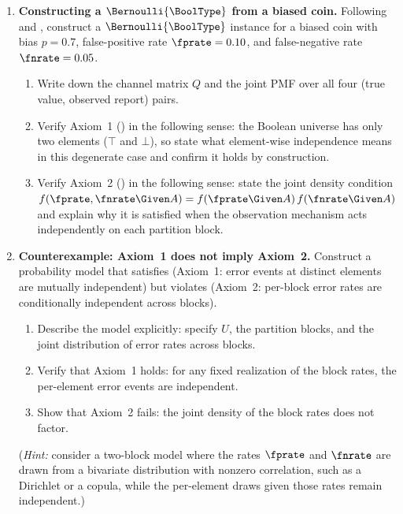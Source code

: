 \begin{enumerate}
\item \exstarstar
\textbf{Constructing a $\Bernoulli{\BoolType}$ from a biased coin.}
Following  and ,
construct a $\Bernoulli{\BoolType}$ instance for a biased coin with
bias $p = 0.7$, false-positive rate $\fprate = 0.10$, and false-negative
rate $\fnrate = 0.05$.
\begin{enumerate}
  \item[(a)] Write down the channel matrix $Q$ and the joint PMF over all
    four (true value, observed report) pairs.
  \item[(b)] Verify Axiom~1 () in the following sense:
    the Boolean universe has only two elements ($\top$ and $\bot$), so state
    what element-wise independence means in this degenerate case and confirm
    it holds by construction.
  \item[(c)] Verify Axiom~2 () in the following
    sense: state the joint density condition $f(\fprate, \fnrate \Given A) =
    f(\fprate \Given A)\,f(\fnrate \Given A)$ and explain why it is satisfied
    when the observation mechanism acts independently on each partition block.
\end{enumerate}


\item \exstarstarstar
\textbf{Counterexample: Axiom~1 does not imply Axiom~2.}
Construct a probability model that satisfies 
(Axiom~1: error events at distinct elements are mutually independent) but
violates  (Axiom~2: per-block error rates are
conditionally independent across blocks).
\begin{enumerate}
  \item[(a)] Describe the model explicitly: specify $U$, the partition blocks,
    and the joint distribution of error rates across blocks.
  \item[(b)] Verify that Axiom~1 holds: for any fixed realization of the
    block rates, the per-element error events are independent.
  \item[(c)] Show that Axiom~2 fails: the joint density of the block rates
    does not factor.
\end{enumerate}
(\textit{Hint:} consider a two-block model where the rates $\fprate$ and
$\fnrate$ are drawn from a bivariate distribution with nonzero correlation,
such as a Dirichlet or a copula, while the per-element draws given those
rates remain independent.)


\end{enumerate}
